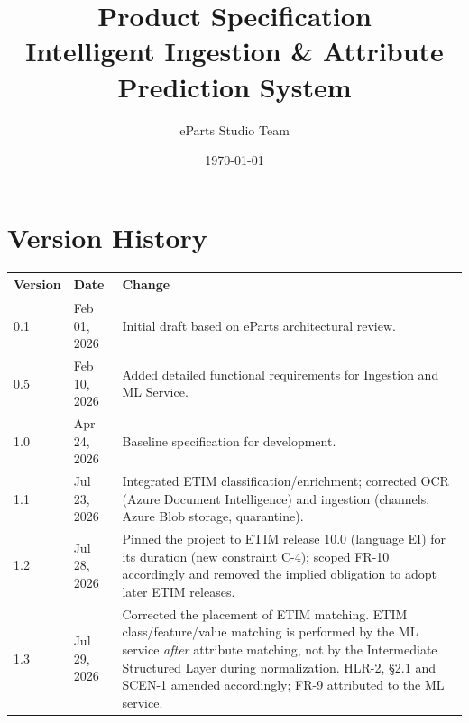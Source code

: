 \documentclass[12pt, a4paper]{article}
\title{Product Specification \\ \vspace{0.5cm} \Large Intelligent Ingestion \& Attribute Prediction System}
\author{eParts Studio Team}
\date{\today}
\begin{document}
\hypersetup{pageanchor=false}

\maketitle
\thispagestyle{empty}
\newpage

\pagestyle{fancy}
\hypersetup{pageanchor=true}
\setcounter{page}{1}
\tableofcontents
\newpage
{}

\section*{Version History}
\begin{tabular}{@{}llp{10cm}@{}}
\toprule
\textbf{Version} & \textbf{Date} & \textbf{Change} \\
\midrule
0.1 & Feb 01, 2026 & Initial draft based on eParts architectural review. \\
0.5 & Feb 10, 2026 & Added detailed functional requirements for Ingestion and ML Service. \\
1.0 & Apr 24, 2026 & Baseline specification for development. \\
1.1 & Jul 23, 2026 & Integrated ETIM classification/enrichment; corrected OCR (Azure Document Intelligence) and ingestion (channels, Azure Blob storage, quarantine). \\
1.2 & Jul 28, 2026 & Pinned the project to ETIM release 10.0 (language EI) for its duration (new constraint C-4); scoped FR-10 accordingly and removed the implied obligation to adopt later ETIM releases. \\
1.3 & Jul 29, 2026 & Corrected the placement of ETIM matching. ETIM class/feature/value matching is performed by the ML service \emph{after} attribute matching, not by the Intermediate Structured Layer during normalization. HLR-2, \S2.1 and SCEN-1 amended accordingly; FR-9 attributed to the ML service. \\
\bottomrule
\end{tabular}

\vspace{1cm}

\end{document}

